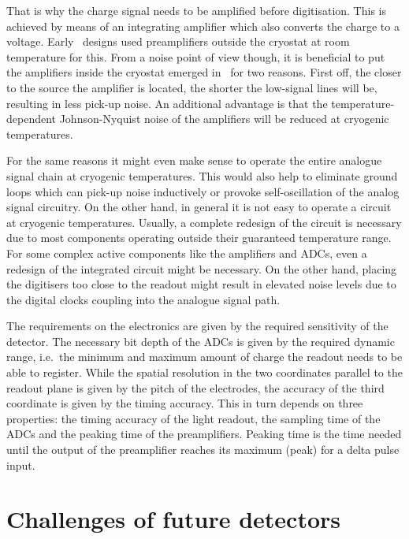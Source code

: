 That is why the charge signal needs to be amplified before digitisation.
This is achieved by means of an integrating amplifier which also converts the charge to a voltage.
Early \lartpc\ designs used preamplifiers outside the cryostat at room temperature for this.
From a noise point of view though, it is beneficial to put the amplifiers inside the cryostat emerged in \lar\ for two reasons.
First off, the closer to the source the amplifier is located, the shorter the low-signal lines will be, resulting in less pick-up noise.
An additional advantage is that the temperature-dependent Johnson-Nyquist noise of the amplifiers will be reduced at cryogenic temperatures.

For the same reasons it might even make sense to operate the entire analogue signal chain at cryogenic temperatures.
This would also help to eliminate ground loops which can pick-up noise inductively or provoke self-oscillation of the analog signal circuitry.
On the other hand, in general it is not easy to operate a circuit at cryogenic temperatures.
Usually, a complete redesign of the circuit is necessary due to most components operating outside their guaranteed temperature range.
For some complex active components like the amplifiers and ADCs, even a redesign of the integrated circuit might be necessary.
On the other hand, placing the digitisers too close to the readout might result in elevated noise levels due to the digital clocks coupling into the analogue signal path.

The requirements on the electronics are given by the required sensitivity of the detector.
The necessary bit depth of the ADCs is given by the required dynamic range, i.e.\ the minimum and maximum amount of charge the readout needs to be able to register.
While the spatial resolution in the two coordinates parallel to the readout plane is given by the pitch of the electrodes, the accuracy of the third coordinate is given by the timing accuracy.
This in turn depends on three properties: the timing accuracy of the light readout, the sampling time of the ADCs and the peaking time of the preamplifiers.
Peaking time is the time needed until the output of the preamplifier reaches its maximum (peak) for a delta pulse input.


\section{Challenges of future detectors\label{sec:lartpc_challenges}}
